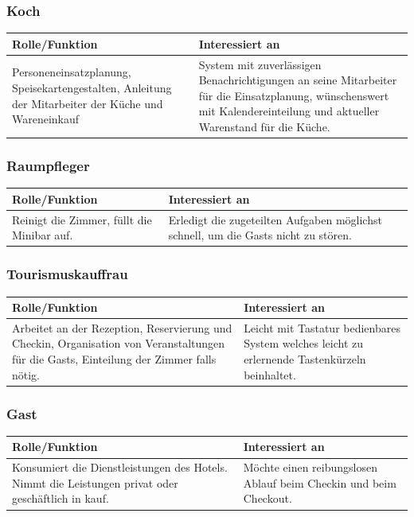 \documentclass[10pt,a4paper,titlepage]{article}
\begin{document}
\subsubsection{Koch}
\begin{tabular}[t]{|p{5cm}|p{5cm}|}
    \hline
    \textbf{Rolle\slash{}Funktion} & \textbf{Interessiert an} \\
    \hline
Personeneinsatzplanung, Speisekartengestalten, Anleitung der \Gls{Mitarbeiter} der Küche und Wareneinkauf &
	System mit zuverlässigen Benachrichtigungen an seine \Gls{Mitarbeiter} für die Einsatzplanung, wünschenswert mit Kalendereinteilung und aktueller Warenstand für die Küche. \\
    \hline
\end{tabular}
\subsubsection{Raumpfleger}
\begin{tabular}[t]{|p{5cm}|p{5cm}|}
    \hline
    \textbf{Rolle\slash{}Funktion} & \textbf{Interessiert an} \\
    \hline
Reinigt die \Gls{Zimmer}, füllt die Minibar auf. &
	Erledigt die zugeteilten Aufgaben möglichst schnell, um die \Glspl{Gast} nicht zu stören. \\
    \hline
\end{tabular}
\subsubsection{Tourismuskauffrau}
\begin{tabular}[t]{|p{5cm}|p{5cm}|}
    \hline
    \textbf{Rolle\slash{}Funktion} & \textbf{Interessiert an} \\
    \hline
Arbeitet an der \Gls{Rezeption}, \Gls{Reservierung} und \Gls{Checkin}, Organisation von Veranstaltungen für die \Glspl{Gast}, Einteilung der \Gls{Zimmer} falls nötig. &
	Leicht mit Tastatur bedienbares System welches leicht zu erlernende Tastenkürzeln beinhaltet. \\
    \hline
\end{tabular}
\subsubsection{\Gls{Gast}}
\begin{tabular}[t]{|p{5cm}|p{5cm}|}
    \hline
    \textbf{Rolle\slash{}Funktion} & \textbf{Interessiert an} \\
    \hline
	Konsumiert die Dienstleistungen des Hotels. Nimmt die Leistungen privat oder geschäftlich in kauf. &
	Möchte einen reibungslosen Ablauf beim \Gls{Checkin} und beim \Gls{Checkout}. \\
    \hline
\end{tabular}
\end{document}

